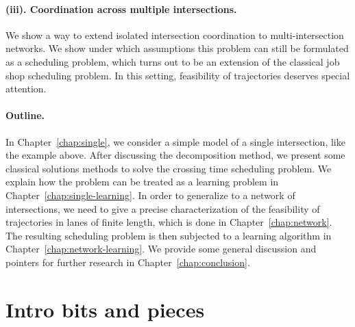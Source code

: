 \documentclass[a4paper]{report}
\theoremstyle{definition}
\theoremstyle{plain}
\begin{document}
\paragraph{(iii). Coordination across multiple intersections.}
We show a way to extend isolated intersection coordination to multi-intersection
networks. We show under which assumptions this problem can still be formulated
as a scheduling problem, which turns out to be an extension of the classical job
shop scheduling problem.
%
In this setting, feasibility of trajectories deserves special attention.

\paragraph{Outline.}

In Chapter~\ref{chap:single}, we consider a simple model of a single
intersection, like the example above. After discussing the decomposition method,
we present some classical solutions methods to solve the crossing time
scheduling problem.
%
We explain how the problem can be treated as a learning problem in
Chapter~\ref{chap:single-learning}.
%
In order to generalize to a network of intersections, we need to give a precise
characterization of the feasibility of trajectories in lanes of finite length,
which is done in Chapter~\ref{chap:network}.
%
The resulting scheduling problem is then subjected to a learning algorithm in
Chapter~\ref{chap:network-learning}.
%
We provide some general discussion and pointers for further research in
Chapter~\ref{chap:conclusion}.

\section{Intro bits and pieces}




\end{document}
